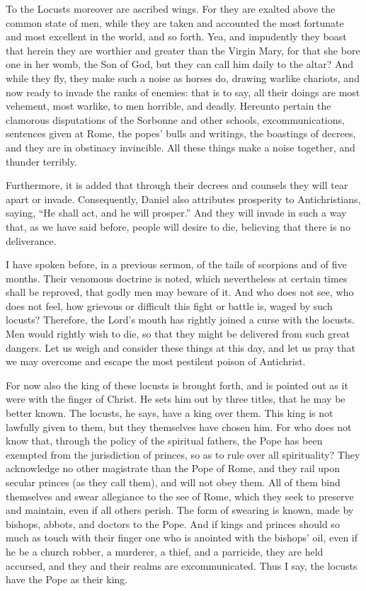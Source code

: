 To the Locusts moreover are ascribed wings. For they are exalted above the common state of men, while they are taken and accounted the most fortunate and most excellent in the world, and so forth. Yea, and impudently they boast that herein they are worthier and greater than the Virgin Mary, for that she bore one in her womb, the Son of God, but they can call him daily to the altar? And while they fly, they make such a noise as horses do, drawing warlike chariots, and now ready to invade the ranks of enemies: that is to say, all their doings are most vehement, most warlike, to men horrible, and deadly. Hereunto pertain the clamorous disputations of the Sorbonne and other schools, excommunications, sentences given at Rome, the popes’ bulls and writings, the boastings of decrees, and they are in obstinacy invincible. All these things make a noise together, and thunder terribly.

Furthermore, it is added that through their decrees and counsels they will tear apart or invade. Consequently, Daniel also attributes prosperity to Antichristians, saying, “He shall act, and he will prosper.” And they will invade in such a way that, as we have said before, people will desire to die, believing that there is no deliverance.

I have spoken before, in a previous sermon, of the tails of scorpions and of five months. Their venomous doctrine is noted, which nevertheless at certain times shall be reproved, that godly men may beware of it. And who does not see, who does not feel, how grievous or difficult this fight or battle is, waged by such locusts? Therefore, the Lord’s mouth has rightly joined a curse with the locusts. Men would rightly wish to die, so that they might be delivered from such great dangers. Let us weigh and consider these things at this day, and let us pray that we may overcome and escape the most pestilent poison of Antichrist.

For now also the king of these locusts is brought forth, and is pointed out as it were with the finger of Christ. He sets him out by three titles, that he may be better known. The locusts, he says, have a king over them. This king is not lawfully given to them, but they themselves have chosen him. For who does not know that, through the policy of the spiritual fathers, the Pope has been exempted from the jurisdiction of princes, so as to rule over all spirituality? They acknowledge no other magistrate than the Pope of Rome, and they rail upon secular princes (as they call them), and will not obey them. All of them bind themselves and swear allegiance to the see of Rome, which they seek to preserve and maintain, even if all others perish. The form of swearing is known, made by bishops, abbots, and doctors to the Pope. And if kings and princes should so much as touch with their finger one who is anointed with the bishops’ oil, even if he be a church robber, a murderer, a thief, and a parricide, they are held accursed, and they and their realms are excommunicated. Thus I say, the locusts have the Pope as their king.

